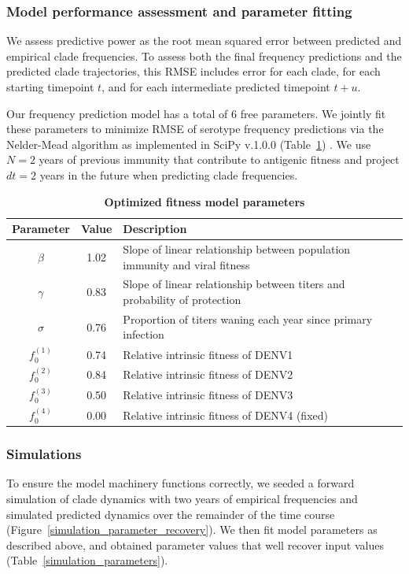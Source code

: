 \documentclass[11pt,oneside,letterpaper]{article}
\begin{document}
\subsubsection*{Model performance assessment and parameter fitting}
We assess predictive power as the root mean squared error between predicted and empirical clade frequencies.
To assess both the final frequency predictions and the predicted clade trajectories, this RMSE includes error for each clade, for each starting timepoint $t$, and for each intermediate predicted timepoint $t+u$.

Our frequency prediction model has a total of 6 free parameters.
We jointly fit these parameters to minimize RMSE of serotype frequency predictions via the Nelder-Mead algorithm as implemented in SciPy v.1.0.0 (Table~\ref{fitness_model_parameters}) \citep{jones2001scipy,gao2012implementing}.
We use $N=2$ years of previous immunity that contribute to antigenic fitness and project $dt=2$ years in the future when predicting clade frequencies.

\begin{table}[ht!]
  \centering
  \caption{
    \textbf{Optimized fitness model parameters}
  }
  \label{fitness_model_parameters}
  \begin{tabular}{c c p{}}
    \hline
    Parameter     & Value & Description \\
    \hline
    $\beta$       & 1.02  & Slope of linear relationship between population immunity and viral fitness \\
    $\gamma$      & 0.83  & Slope of linear relationship between titers and probability of protection \\
    $\sigma$      & 0.76  & Proportion of titers waning each year since primary infection \\
    $f_{0}^{(1)}$ & 0.74  & Relative intrinsic fitness of DENV1 \\
    $f_{0}^{(2)}$ & 0.84  & Relative intrinsic fitness of DENV2 \\
    $f_{0}^{(3)}$ & 0.50  & Relative intrinsic fitness of DENV3 \\
    $f_{0}^{(4)}$ & 0.00  & Relative intrinsic fitness of DENV4 (fixed) \\
    \hline
  \end{tabular}
\end{table}

\subsubsection*{Simulations}
To ensure the model machinery functions correctly, we seeded a forward simulation of clade dynamics with two years of empirical frequencies and simulated predicted dynamics over the remainder of the time course (Figure~\ref{simulation_parameter_recovery}).
We then fit model parameters as described above, and obtained parameter values that well recover input values (Table~\ref{simulation_parameters}).
\end{document}
